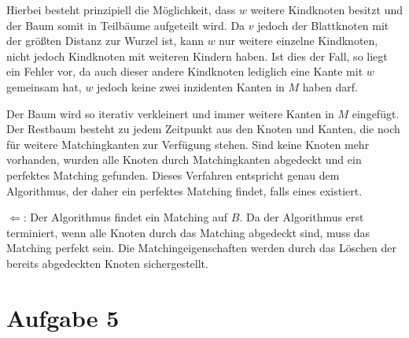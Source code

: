 \documentclass[a4paper]{article}
\begin{document}
Hierbei besteht prinzipiell die Möglichkeit, dass $w$ weitere Kindknoten
besitzt und der Baum somit in Teilbäume aufgeteilt wird. Da $v$ jedoch der
Blattknoten mit der größten Distanz zur Wurzel ist, kann $w$ nur weitere
einzelne Kindknoten, nicht jedoch Kindknoten mit weiteren Kindern haben.
Ist dies der Fall, so liegt ein Fehler vor, da auch dieser andere Kindknoten
lediglich eine Kante mit $w$ gemeinsam hat, $w$ jedoch keine zwei inzidenten
Kanten in $M$ haben darf.

Der Baum wird so iterativ verkleinert und immer weitere Kanten in $M$
eingefügt. Der Restbaum besteht zu jedem Zeitpunkt aus den Knoten und
Kanten, die noch für weitere Matchingkanten zur Verfügung stehen.
Sind keine Knoten mehr vorhanden, wurden alle Knoten durch Matchingkanten
abgedeckt und ein perfektes Matching gefunden.
Dieses Verfahren entspricht genau dem Algorithmus, der daher ein perfektes
Matching findet, falls eines existiert.

$\Leftarrow$: Der Algorithmus findet ein Matching auf $B$. Da der
Algorithmus erst terminiert, wenn alle Knoten durch das Matching abgedeckt
sind, muss das Matching perfekt sein. Die Matchingeigenschaften werden durch
das Löschen der bereits abgedeckten Knoten sichergestellt.

\section{Aufgabe 5}
\end{document}
